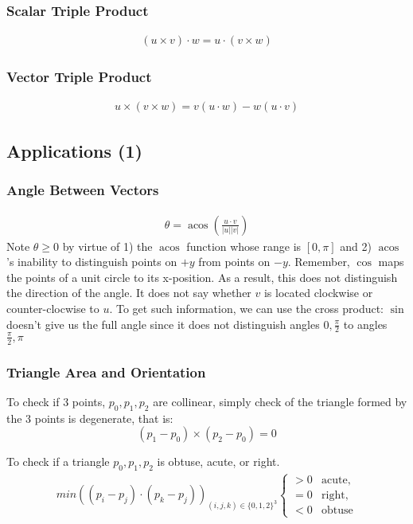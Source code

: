 \documentclass[12pt]{report}
\DeclareMathOperator{\acos}{acos}
\begin{document}
\subsubsection{Scalar Triple Product}
\begin{align}(u \times v) \cdot w = u \cdot (v \times w)\end{align}
\subsubsection{Vector Triple Product}
\begin{align}u \times (v \times w) = v(u \cdot w) - w(u \cdot v)\end{align}
\subsection{Applications (1)}
\subsubsection{Angle Between Vectors}
\begin{align}
	\theta = \acos\left(\frac{u \cdot v}{|u||v|}\right) 
\end{align}
Note $\theta \geq 0$ by virtue of 1) the $\acos$ function whose range is $[0, \pi]$ and 2) $\acos$'s inability to distinguish points on $+y$ from points on $-y$. Remember, $\cos$ maps the points of a unit circle to its x-position. As a result, this does not distinguish the direction of the angle. It does not say whether $v$ is located clockwise or counter-clocwise to $u$. To get such information, we can use the cross product:
$\sin$ doesn't give us the full angle since it does not distinguish angles $0, \frac{\pi}{2}$ to angles $\frac{\pi}{2}, \pi$
		
\subsubsection{Triangle Area and Orientation}
		
To check if 3 points, ${p_0, p_1, p_2}$ are collinear, simply check of the triangle formed by the 3 points is degenerate, that is:
$$
(p_1-p_0)\times (p_2-p_0) = 0
$$
		
To check if a triangle ${p_0, p_1, p_2}$ is obtuse, acute, or right.
\begin{align}
	min((p_i - p_j) \cdot (p_k - p_j))_{ (i,j,k) \in \{0,1,2\}^3}
	\begin{cases}
	> 0 & \text{acute}, \\
	= 0 & \text{right}, \\
	< 0 & \text{obtuse} 
	\end{cases}
\end{align}
		
\end{document}
